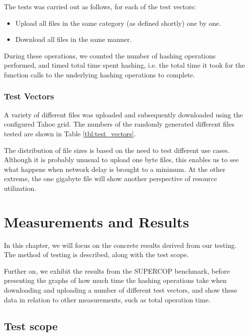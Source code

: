 \documentclass[english,12pt,a4paper]{book}
\begin{document}
The tests was carried out as follows, for each of the test vectors:

\begin{itemize}
  \item Upload all files in the same category (as defined shortly) one by one.
  \item Download all files in the same manner.
\end{itemize}

During these operations, we counted the number of hashing operations performed,
and timed total time spent hashing, i.e. the total time it took for the function
calls to the underlying hashing operations to complete.

\subsection{Test Vectors}

A variety of different files was uploaded and subsequently downloaded using the
configured Tahoe grid. The numbers of the randomly generated different files
tested are shown in Table \ref{tbl:test_vectors}.



The distribution of file sizes is based on the need to test different use cases.
Although it is probably unusual to upload one byte files, this enables us to see
what happens when network delay is brought to a minimum. At the other extreme,
the one gigabyte file will show another perspective of resource utilization.

\chapter{Measurements and Results}

In this chapter, we will focus on the concrete results derived from our testing.
The method of testing is described, along with the test scope.

Further on, we exhibit the results from the \ac{SUPERCOP} benchmark, before
presenting the graphs of how much time the hashing operations take when
downloading and uploading a number of different test vectors, and show these
data in relation to other measurements, such as total operation time.

\section{Test scope}
\end{document}
